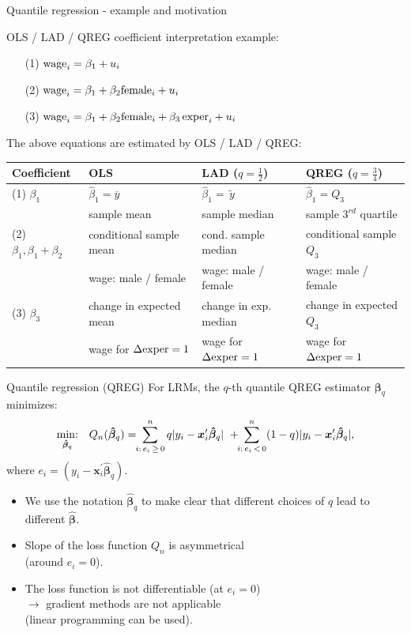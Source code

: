 \documentclass{beamer}
\begin{document}
\begin{frame}{Quantile regression - example and motivation}

OLS / LAD / QREG coefficient interpretation example:\\
\bigskip
\begin{itemize}
    \item[(1)] $\textnormal{wage}_i = \beta_1 + u_i$
    \item[(2)] $\textnormal{wage}_i = \beta_1 + \beta_2 \textnormal{female}_i + u_i$
    \item[(3)] $\textnormal{wage}_i = \beta_1 + \beta_2 \textnormal{female}_i + \beta_3 \, \textnormal{exper}_i + u_i$
\end{itemize}
\bigskip
The above equations are estimated by OLS / LAD / QREG:\\
\bigskip
\tiny
\begin{tabular}{|l| l |l |l|}
 \hline
 Coefficient   &     OLS     &   LAD ($q=\tfrac{1}{2}$)   &  QREG ($q=\tfrac{3}{4}$)\\
 \hline 
 (1) $\beta_1$ &   $\hat{\beta}_1=\overline{y}$ & $\hat{\beta}_1=\tilde{\,y\,}$ & $\hat{\beta}_1=Q_3$\\
 & sample mean  & sample median & sample $3^{rd}$ quartile\\
 \hline
 (2) $\beta_1, \beta_1\!+\!\beta_2$ & conditional sample mean & cond. sample median & conditional sample $Q_3$\\
  & wage: male / female & wage: male / female & wage: male / female \\
  \hline
  (3) $\beta_3$ & change in expected mean & change in exp. median & change in expected $Q_3$\\
   & wage for $\Delta\textnormal{exper}=1$ & wage for $\Delta\textnormal{exper}=1$ & wage for $\Delta\textnormal{exper}=1$\\
   \hline
\end{tabular}
\end{frame}
\begin{frame}{Quantile regression (QREG)}
For LRMs, the $q$-th quantile QREG estimator $\bm{\beta}_q$ minimizes:
$$
\underset{\bm{\hat{\beta}}_q}{\textnormal{min:}} \quad Q_n(\bm{\hat{\beta}}_q) =
\! \! \sum^n_{i:\, e_i \, \geq \, 0} q|y_i - \bm{x}_i^{\prime}\bm{\hat{\beta}}_q| \,\, +
\! \! \sum^n_{i:\, e_i\, < \, 0} (1-q)|y_i - \bm{x}_i^{\prime}\bm{\hat{\beta}}_q|,
$$
where $e_i = (y_i - \bm{x}_i^{\prime}\bm{\hat{\beta}}_q)$.

\begin{itemize}
    \item We use the notation $\bm{\hat{\beta}}_q$ to make clear that different choices of $q$ lead to different  $\bm{\hat{\beta}}$.
    \item Slope of the loss function $Q_n$ is asymmetrical \\(around $e_i=0$).
    \item The loss function is not differentiable (at $e_i=0$) \\$\rightarrow$ gradient methods are not applicable \\(linear programming can be used).
\end{itemize}
\end{frame}
\end{document}
